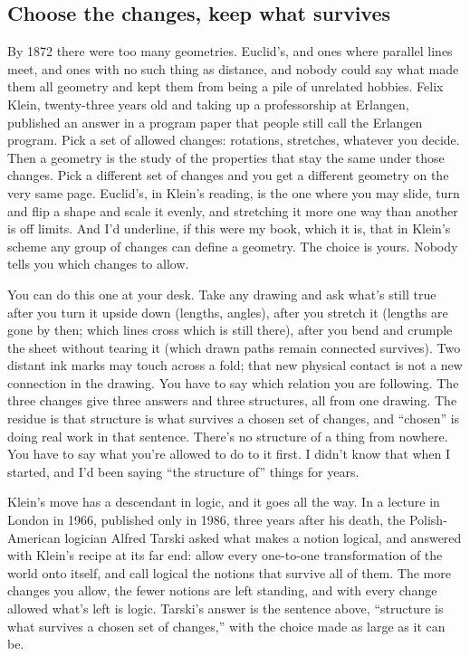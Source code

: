 \documentclass[11pt,twoside]{article}
\theoremstyle{thielethm}
\theoremstyle{thieledef}
\theoremstyle{thieledef}
\theoremstyle{thieledef}
\theoremstyle{thielethm}
\theoremstyle{thieleobs}
\theoremstyle{thielethm}
\begin{document}
\subsection{Choose the changes, keep what survives}

By 1872 there were too many geometries. Euclid's, and ones where parallel lines meet, and ones with no such thing as distance, and nobody could say what made them all geometry and kept them from being a pile of unrelated hobbies. Felix Klein, twenty-three years old and taking up a professorship at Erlangen, published an answer in a program paper that people still call the Erlangen program. Pick a set of allowed changes: rotations, stretches, whatever you decide. Then a geometry is the study of the properties that stay the same under those changes. Pick a different set of changes and you get a different geometry on the very same page. Euclid's, in Klein's reading, is the one where you may slide, turn and flip a shape and scale it evenly, and stretching it more one way than another is off limits. And I'd underline, if this were my book, which it is, that in Klein's scheme any group of changes can define a geometry. The choice is yours. Nobody tells you which changes to allow.

You can do this one at your desk. Take any drawing and ask what's still true after you turn it upside down (lengths, angles), after you stretch it (lengths are gone by then; which lines cross which is still there), after you bend and crumple the sheet without tearing it (which drawn paths remain connected survives). Two distant ink marks may touch across a fold; that new physical contact is not a new connection in the drawing. You have to say which relation you are following. The three changes give three answers and three structures, all from one drawing. The residue is that structure is what survives a chosen set of changes, and ``chosen'' is doing real work in that sentence. There's no structure of a thing from nowhere. You have to say what you're allowed to do to it first. I didn't know that when I started, and I'd been saying ``the structure of'' things for years.

Klein's move has a descendant in logic, and it goes all the way. In a lecture in London in 1966, published only in 1986, three years after his death, the Polish- American logician Alfred Tarski asked what makes a notion logical, and answered with Klein's recipe at its far end: allow every one-to-one transformation of the world onto itself, and call logical the notions that survive all of them. The more changes you allow, the fewer notions are left standing, and with every change allowed what's left is logic. Tarski's answer is the sentence above, ``structure is what survives a chosen set of changes,'' with the choice made as large as it can be.
\end{document}
